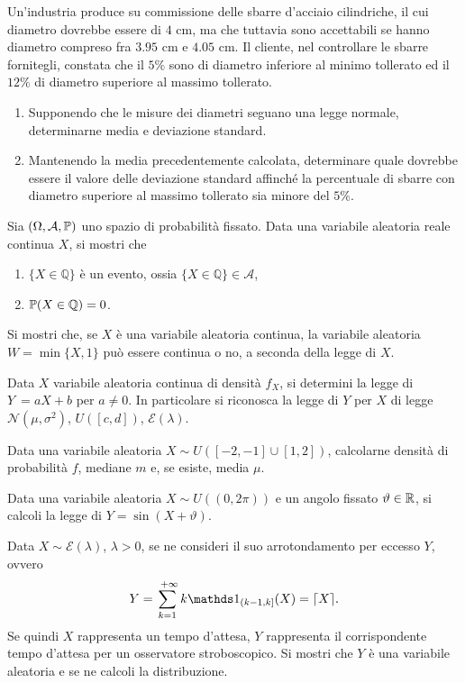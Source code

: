 Un'industria produce su commissione delle sbarre d'acciaio cilindriche, il cui diametro dovrebbe essere di $4$ cm, ma che tuttavia sono accettabili se hanno diametro compreso fra $3.95$ cm e $4.05$ cm. Il cliente, nel controllare le sbarre fornitegli, constata che il $5\%$ sono di diametro inferiore al minimo tollerato ed il $12\%$ di diametro superiore al massimo tollerato.
\begin{enumerate}
\item Supponendo che le misure dei diametri seguano una legge normale, determinarne media e deviazione standard.
\item Mantenendo la media precedentemente calcolata, determinare quale dovrebbe essere il valore delle deviazione standard affinché la percentuale di sbarre con diametro superiore al massimo tollerato sia minore del $5\%$.
\end{enumerate}
\Esercizio{}

Sia $(\Omega ,\mathcal{A} ,\mathbb{P})$ uno spazio di probabilità fissato. Data una variabile aleatoria reale continua $X$, si mostri che
\begin{enumerate}
\item $\{X\in \mathbb{Q}\}$ è un evento, ossia $\{X\in \mathbb{Q}\} \in \mathcal{A}$,
\item $\mathbb{P}(X\in \mathbb{Q}) =0$.
\end{enumerate}
\Esercizio{}

Si mostri che, se $X$ è una variabile aleatoria continua, la variabile aleatoria $W=\min\{X,1\}$ può essere continua o no, a seconda della legge di $X$.
\Esercizio{}

Data $X$ variabile aleatoria continua di densità $f_{X}$, si determini la legge di $Y\ =aX+b$ per $a\neq 0$. In particolare si riconosca la legge di $Y$ per $X$ di legge $\mathcal{N}\left(\mu ,\sigma^{2}\right)$, $U([c,d])$, $\mathcal{E}(\lambda)$.
\Esercizio{}

Data una variabile aleatoria $X\sim U([-2,-1] \cup [1,2])$, calcolarne densità di probabilità $f$, mediane $m$ e, se esiste, media $\mu $.
\Esercizio{$\star$}

Data una variabile aleatoria $X\sim U((0,2\pi))$ e un angolo fissato $\vartheta \in \mathbb{R}$, si calcoli la legge di $Y=\sin(X+\vartheta)$.
\Esercizio{}

Data $X\sim \mathcal{E}(\lambda)$, $\lambda  >0$, se ne consideri il suo arrotondamento per eccesso $Y$, ovvero
\begin{equation*}
Y=\sum\limits_{k=1}^{\ +\infty } k\Ind_{(k-1,k]}(X) =\lceil X\rceil .
\end{equation*}
Se quindi $X$ rappresenta un tempo d'attesa, $Y$ rappresenta il corrispondente tempo d'attesa per un osservatore stroboscopico. Si mostri che $Y$ è una variabile aleatoria e se ne calcoli la distribuzione.
\Esercizio{}

